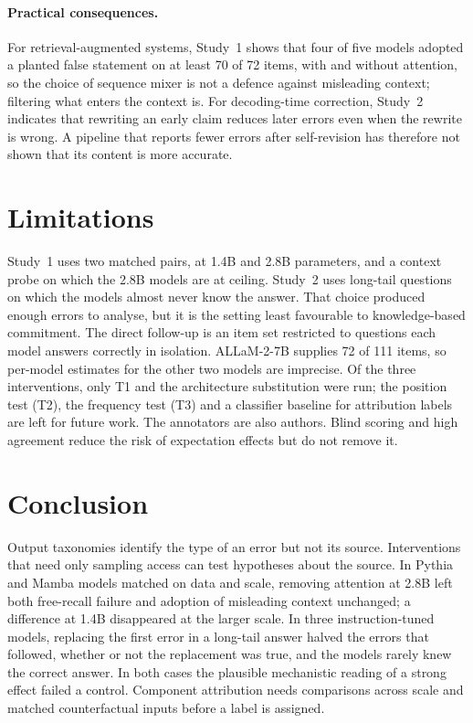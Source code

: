 \documentclass[10pt]{article}
\begin{document}
\paragraph{Practical consequences.} For retrieval-augmented systems, Study~1 shows that four of five models adopted a planted false statement on at least 70 of 72 items, with and without attention, so the choice of sequence mixer is not a defence against misleading context; filtering what enters the context is. For decoding-time correction, Study~2 indicates that rewriting an early claim reduces later errors even when the rewrite is wrong. A pipeline that reports fewer errors after self-revision has therefore not shown that its content is more accurate.

\section{Limitations}
\label{sec:limits}

Study~1 uses two matched pairs, at 1.4B and 2.8B parameters, and a context probe on which the 2.8B models are at ceiling. Study~2 uses long-tail questions on which the models almost never know the answer. That choice produced enough errors to analyse, but it is the setting least favourable to knowledge-based commitment. The direct follow-up is an item set restricted to questions each model answers correctly in isolation. ALLaM-2-7B supplies 72 of 111 items, so per-model estimates for the other two models are imprecise. Of the three interventions, only T1 and the architecture substitution were run; the position test (T2), the frequency test (T3) and a classifier baseline for attribution labels are left for future work. The annotators are also authors. Blind scoring and high agreement reduce the risk of expectation effects but do not remove it.

\section{Conclusion}
\label{sec:conclusion}

Output taxonomies identify the type of an error but not its source. Interventions that need only sampling access can test hypotheses about the source. In Pythia and Mamba models matched on data and scale, removing attention at 2.8B left both free-recall failure and adoption of misleading context unchanged; a difference at 1.4B disappeared at the larger scale. In three instruction-tuned models, replacing the first error in a long-tail answer halved the errors that followed, whether or not the replacement was true, and the models rarely knew the correct answer. In both cases the plausible mechanistic reading of a strong effect failed a control. Component attribution needs comparisons across scale and matched counterfactual inputs before a label is assigned.
\end{document}
